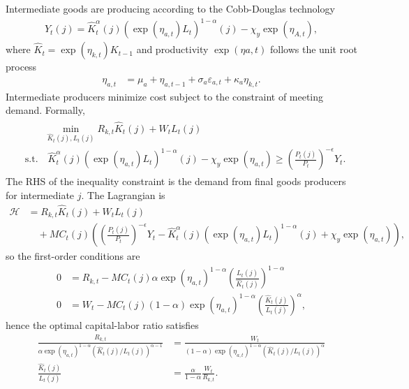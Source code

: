 \documentclass[12 pt, oneside]{article}
\theoremstyle{definition}
\theoremstyle{definition}
\theoremstyle{definition}
\newcommand{\calH}{\mathcal{H}}
\begin{document}
Intermediate goods are producing according to the Cobb-Douglas technology
\begin{align}\label{eq:intermediate goods production function}
  Y_t(j) =  \hat{K}_t^\alpha(j)(\exp(\eta_{a, t})L_t)^{1 - \alpha}(j) - \chi_y\exp(\eta_{A, t}),
\end{align}
where $\hat{K}_t = \exp(\eta_{k, t})K_{t - 1}$ and productivity $\exp(\eta{a, t})$ follows the unit root process
\begin{align}\label{eq:productivity process}
  \eta_{a, t} & = \mu_a + \eta_{a, t - 1} + \sigma_a \varepsilon_{a, t} + \kappa_a\eta_{k, t}.
\end{align}
Intermediate producers minimize cost subject to the constraint of meeting demand. Formally,
\begin{align}
  \begin{split}
    & \quad\quad\min_{\hat{K}_t(j), L_t(j)} R_{k, t} \hat{K}_t(j) + W_t L_t(j)\\
    &\text{s.t.}\quad  \hat{K}_t^\alpha(j) (\exp(\eta_{a, t})L_t)^{1 - \alpha}(j) - \chi_y\exp(\eta_{a, t}) \geq \left(\frac{P_t(j)}{P_t}\right)^{-\epsilon}Y_t.
  \end{split}
\end{align}
The RHS of the inequality constraint is the demand from final goods producers for intermediate $j$. The Lagrangian is
\begin{align*}
  \calH & = R_{k, t} \hat{K}_t(j) + W_t L_t(j)\\
        &\quad +  MC_t(j)\left(\left(\frac{P_t(j)}{P_t}\right)^{-\epsilon}Y_t - \hat{K}_t^\alpha(j) (\exp(\eta_{a, t})L_t)^{1 - \alpha}(j) + \chi_y\exp(\eta_{a, t})\right),
\end{align*}
so the first-order conditions are
\begin{align*}
  0 & = R_{k, t} - MC_t(j) \alpha \exp(\eta_{a, t})^{1 - \alpha} \left(\frac{L_t(j)}{\hat{K}_t(j)}\right)^{1 - \alpha}\\
  0 & = W_t - MC_t(j) (1-\alpha) \exp(\eta_{a, t})^{1 - \alpha}  \left(\frac{\hat{K}_t(j)}{L_t(j)}\right)^{\alpha},
\end{align*}
hence the optimal capital-labor ratio satisfies
\begin{align*}
  \frac{R_{k, t}}{\alpha \exp(\eta_{a, t})^{1 - \alpha}(\hat{K}_t(j)/L_t(j))^{\alpha - 1}} & = \frac{W_t}{(1-\alpha) \exp(\eta_{a, t})^{1 - \alpha}(\hat{K}_t(j)/L_t(j))^{ \alpha}}\\
  \frac{\hat{K}_t(j)}{L_t(j)} & =\frac{\alpha}{1 - \alpha} \frac{W_t}{R_{k, t}}.
\end{align*}
\end{document}
